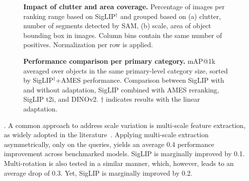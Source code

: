 \begin{figure}[t]
    \centering
    \vspace{-10pt}
    \caption{\textbf{Impact of clutter and area coverage.} Percentage of images per ranking range based on SigLIP$^\dagger$ and grouped based on (a) clutter, \ie number of segments detected by SAM, (b) scale, \ie area of object bounding box in images. Column bins contain the same number of positives. Normalization per row is applied.
    \label{fig:heatmaps_scale}
    \vspace{-6pt}
    }
\end{figure}

\begin{figure*}[t]
    \centering
    \scalebox{1.}{
       
    }
    \vspace{-11pt}
    \caption{\textbf{Performance comparison per primary category.} mAP@1k  averaged over objects in the same primary-level category size, sorted by SigLIP$^\dagger$+AMES performance. Comparison between SigLIP with and without adaptation, SigLIP combined with AMES reranking, SigLIP t2i, and DINOv2. $\dagger$ indicates results with the linear adaptation.
    \label{fig:performance_barplot}
    \vspace{-10pt}
    }
\end{figure*}

. 
A common approach to address scale variation is multi-scale feature extraction, as widely adopted in the literature~\cite{rtc19,sck+23}.
Applying multi-scale extraction asymmetrically, \ie only on the queries, yields an average 0.4 performance improvement across benchmarked models. SigLIP is marginally improved by 0.1. Multi-rotation is also tested in a similar manner, which, however, leads to an average drop of 0.3. Yet, SigLIP is marginally improved by 0.2.

